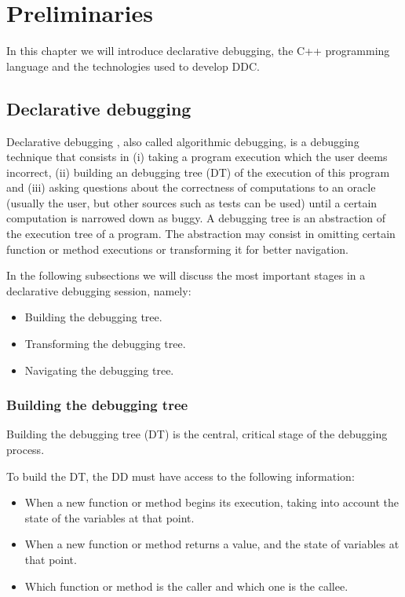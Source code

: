 \chapter{Preliminaries}
\label{cap:preliminares}

In this chapter we will introduce declarative debugging, the C++ programming language and the technologies used to develop DDC.

\section{Declarative debugging}
Declarative debugging \cite{shapiro1982algorithmic}, also called algorithmic debugging, is a debugging technique that consists in (i) taking a program execution which the user deems incorrect, (ii) building an debugging tree (DT) of the execution of this program and (iii) asking questions about the correctness of computations to an oracle (usually the user, but other sources such as tests can be used) until a certain computation is narrowed down as buggy.
A debugging tree is an abstraction of the execution tree of a program. The abstraction may consist in omitting certain function or method executions or transforming it for better navigation. 

In the following subsections we will discuss the most important stages in a declarative debugging session, namely:
\begin{itemize}
    \item Building the debugging tree.
    \item Transforming the debugging tree.
    \item Navigating the debugging tree.
\end{itemize}
\subsection{Building the debugging tree}

Building the debugging tree (DT) is the central, critical stage of the debugging process.

To build the DT, the DD must have access to the following information:
\begin{itemize}
    \item When a new function or method begins its execution, taking into account the state of the variables at that point.
    \item When a new function or method returns a value, and the state of variables at that point.
    \item Which function or method is the caller and which one is the callee.
\end{itemize}

